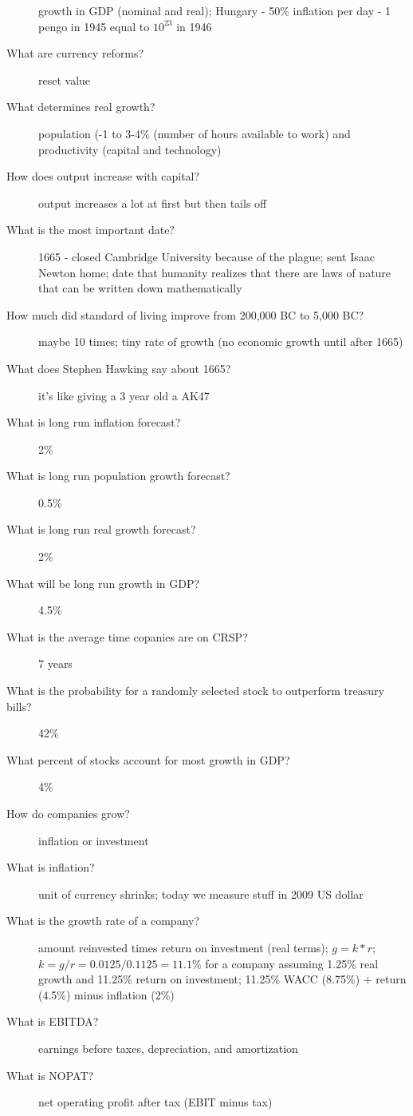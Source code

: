 \documentclass[11pt]{article}
\begin{document}
\begin{description}
  growth in GDP (nominal and real);
  Hungary - 50\% inflation per day - 1 pengo in 1945 equal to $10^{23}$ in 1946
\item[What are currency reforms?]
  reset value
\item[What determines real growth?]
  population (-1 to 3-4\% (number of hours available to work) and productivity (capital and technology)
\item[How does output increase with capital?]
  output increases a lot at first but then tails off
\item[What is the most important date?]
  1665 - closed Cambridge University because of the plague;
  sent Isaac Newton home;
  date that humanity realizes that there are laws of nature that can be written down mathematically
\item[How much did standard of living improve from 200,000 BC to 5,000 BC?]
  maybe 10 times; tiny rate of growth (no economic growth until after 1665)
\item[What does Stephen Hawking say about 1665?]
  it's like giving a 3 year old a AK47
\item[What is long run inflation forecast?]
  2\%
\item[What is long run population growth forecast?]
  0.5\%
\item[What is long run real growth forecast?]
  2\%
\item[What will be long run growth in GDP?]
  4.5\%
\item[What is the average time copanies are on CRSP?]
  7 years
\item[What is the probability for a randomly selected stock to outperform treasury bills?]
  42\%
\item[What percent of stocks account for most growth in GDP?]
  4\%
\item[How do companies grow?]
  inflation or investment
\item[What is inflation?]
  unit of currency shrinks; today we measure stuff in 2009 US dollar
\item[What is the growth rate of a company?]
  amount reinvested times return on investment (real terms);
  $g = k * r$;
  $k = g/r = 0.0125/0.1125 = 11.1\%$ for a company assuming 1.25\% real growth and 11.25\% return on investment;
  11.25\% WACC (8.75\%) + return (4.5\%) minus inflation (2\%)
\item[What is EBITDA?]
  earnings before taxes, depreciation, and amortization
\item[What is NOPAT?]
  net operating profit after tax (EBIT minus tax)

\end{description}
\end{document}
